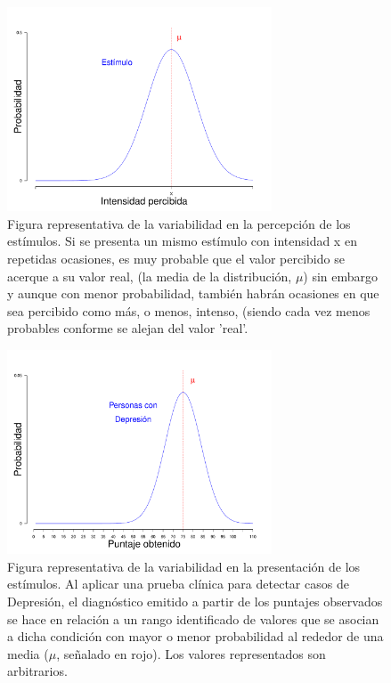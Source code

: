 \begin{figure}[th]
\centering
\includegraphics[width=0.70\textwidth]{Figures/Signal_Perception} 
\caption[Variabilidad en la percepción de los estímulos]{Figura representativa de la variabilidad en la percepción de los estímulos. Si se presenta un mismo estímulo con intensidad x en repetidas ocasiones, es muy probable que el valor percibido se acerque a su valor real, (la media de la distribución, $\mu$) sin embargo y aunque con menor probabilidad, también habrán ocasiones en que sea percibido como más, o menos, intenso, (siendo cada vez menos probables conforme se alejan del valor 'real'.}
\label{fig:Senal_percepcion}
\end{figure}


\begin{figure}[th]
\centering
\includegraphics[width=0.70\textwidth]{Figures/Signal_Presentation} 
\caption[Variabilidad en la presentación de los estímulos]{Figura representativa de la variabilidad en la presentación de los estímulos. Al aplicar una prueba clínica para detectar casos de Depresión, el diagnóstico emitido a partir de los puntajes observados se hace en relación a un rango identificado de valores que se asocian a dicha condición con mayor o menor probabilidad al rededor de una media ($\mu$, señalado en rojo). Los valores representados son arbitrarios.}
\label{fig:Senal_presentacion}
\end{figure}


